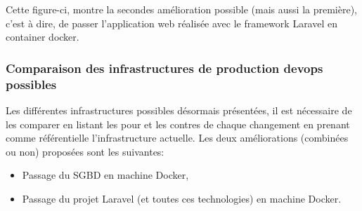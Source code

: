 \documentclass[
    iai, %
    il, %
]{heig-tb}
\begin{document}
Cette figure-ci, montre la secondes amélioration possible (mais aussi la première), c'est à dire, de passer l'application web réalisée avec le framework Laravel en container docker.

\subsubsection{Comparaison des infrastructures de production devops possibles}
Les différentes infrastructures possibles désormais présentées, il est nécessaire de les comparer en listant les pour et les contres de chaque changement en prenant comme référentielle l'infrastructure actuelle.
Les deux améliorations (combinées ou non) proposées sont les suivantes:
\begin{itemize}
    \item Passage du SGBD en machine Docker,
    \item Passage du projet Laravel (et toutes ces technologies) en machine Docker.
\end{itemize}
\end{document}
